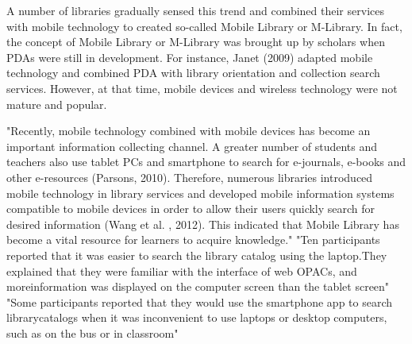 \begin{itemize}
        A number of libraries gradually sensed this trend and combined their services with mobile technology to created so-called Mobile Library or M-Library. In fact, the concept of Mobile Library or M-Library was brought up by scholars when PDAs were still in development. For instance, Janet (2009) adapted mobile technology and combined PDA with library orientation and collection search services. However, at that time, mobile devices and wireless technology were not mature and popular.
        
        "Recently, mobile technology combined with mobile devices has become an important information collecting channel. A greater number of students and teachers also use tablet PCs and smartphone to search for e-journals, e-books and other e-resources (Parsons, 2010). Therefore, numerous libraries introduced mobile technology in library services and developed mobile information systems compatible to mobile devices in order to allow their users quickly search for desired information (Wang et al. , 2012). This indicated that Mobile Library has become a vital resource for learners to acquire knowledge."
        "Ten participants reported that it was easier to search the library catalog using the laptop.They explained that they were familiar with the interface of web OPACs, and moreinformation was displayed on the computer screen than the tablet screen"
        "Some participants reported that they would use the smartphone app to search librarycatalogs when it was inconvenient to use laptops or desktop computers, such as on the bus or in classroom"
        \cite{given_one}
       
    \end{itemize}
    
